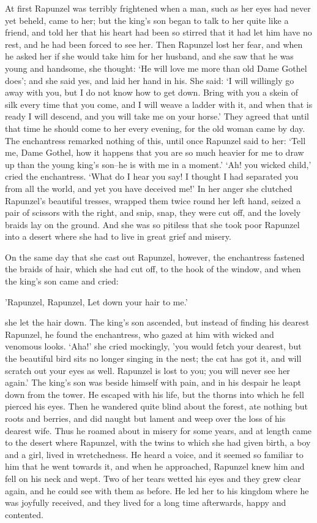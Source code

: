 At first Rapunzel was terribly frightened when a man, such as her eyes had never yet beheld, came to her; but the king's son began to talk to her quite like a friend, and told her that his heart had been so stirred that it had let him have no rest, and he had been forced to see her. Then Rapunzel lost her fear, and when he asked her if she would take him for her husband, and she saw that he was young and handsome, she thought: `He will love me more than old Dame Gothel does'; and she said
yes, and laid her hand in his. She said: `I will willingly go away with you, but I do not know how to get down. Bring with you a skein of silk every time that you come, and I will weave a ladder with it, and when that is ready I will descend, and you will take me on your horse.' They agreed that until that time he should come to her every evening, for the old woman came by day. The enchantress remarked nothing of this, until once Rapunzel said to her: `Tell me, Dame Gothel, how it happens that you are so much heavier for me to draw up than the young king's son--he is with me in a moment.' `Ah! you wicked child,' cried the enchantress. `What do I hear you say! I thought I had separated you from all the world, and yet you have deceived me!' In her anger she clutched Rapunzel's beautiful tresses, wrapped them twice round her left hand, seized a pair of scissors with the right, and snip, snap, they were cut off, and the lovely braids lay on the ground. And she was so pitiless that she took poor Rapunzel into a desert where she had to live in great grief and misery.

On the same day that she cast out Rapunzel, however, the enchantress fastened the braids of hair, which she had cut off, to the hook of the window, and when the king's son came and cried:

'Rapunzel, Rapunzel,
Let down your hair to me.'

she let the hair down. The king's son ascended, but instead of finding his dearest Rapunzel, he found the enchantress, who gazed at him with wicked and venomous looks. `Aha!' she cried mockingly, 'you would fetch your dearest, but the beautiful bird sits no longer singing in the nest;
the cat has got it, and will scratch out your eyes as well. Rapunzel is lost to you; you will never see her again.' The king's son was beside himself with pain, and in his despair he leapt down from the tower. He escaped with his life, but the thorns into which he fell pierced his eyes. Then he wandered quite blind about the forest, ate nothing but roots and berries, and did naught but lament and weep over the loss of his dearest wife. Thus he roamed about in misery for some years, and at
length came to the desert where Rapunzel, with the twins to which she had given birth, a boy and a girl, lived in wretchedness. He heard a voice, and it seemed so familiar to him that he went towards it, and when he approached, Rapunzel knew him and fell on his neck and wept. Two of her tears wetted his eyes and they grew clear again, and he could see with them as before. He led her to his kingdom where he was joyfully received, and they lived for a long time afterwards, happy and contented.
